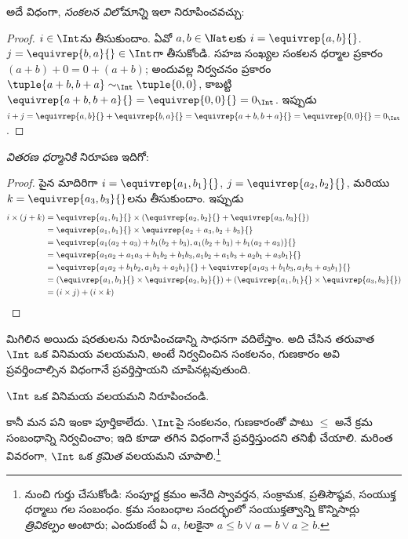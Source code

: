 \documentclass[../../../include/open-logic-section]{subfiles}
\begin{document}
అదే విధంగా, \emph{సంకలన విలోమాన్ని} ఇలా నిరూపించవచ్చు:

\begin{proof}
$i \in \Int$ను తీసుకుందాం. ఏవో $a,b \in \Nat$లకు
$i = \equivrep{a,b}{}$. $j = \equivrep{b,a}{} \in \Int$గా
తీసుకోండి. సహజ సంఖ్యల సంకలన ధర్మాల ప్రకారం
$(a+b) + 0 = 0 + (a+b)$; అందువల్ల నిర్వచనం ప్రకారం
$\tuple{a+b, b+a} \sim_\Int \tuple{0,0}$, కాబట్టి
$\equivrep{a+b, b+a}{} = \equivrep{0, 0}{} = 0_\Int$. ఇప్పుడు
$i + j = \equivrep{a,b}{}+\equivrep{b,a}{}=
\equivrep{a+b, b+a}{}= \equivrep{0, 0}{} = 0_\Int$.
\end{proof}

\emph{వితరణ ధర్మానికి} నిరూపణ ఇదిగో:

\begin{proof}
పైన మాదిరిగా $i = \equivrep{a_1, b_1}{}$,
$j = \equivrep{a_2,b_2}{}$, మరియు $k = \equivrep{a_3, b_3}{}$లను
తీసుకుందాం. ఇప్పుడు
\begin{align*}
	i \times (j + k)
	&= \equivrep{a_1, b_1}{} \times (\equivrep{a_2,b_2}{} + \equivrep{a_3, b_3}{})\\
	&= \equivrep{a_1, b_1}{} \times \equivrep{a_2 + a_3,b_2+b_3}{}\\
	&= \equivrep{a_1  (a_2 + a_3) + b_1  (b_2+b_3), a_1  (b_2 + b_3) + b_1 (a_2 + a_3)}{}\\
	&= \equivrep{a_1 a_2 + a_1a_3 + b_1 b_2+b_1b_3, a_1 b_2 + a_1b_3 + a_2b_1 + a_3b_1}{}\\
	&= \equivrep{a_1a_2 + b_1b_2, a_1b_2 + a_2b_1}{} + \equivrep{a_1a_3 + b_1b_3, a_1b_3 + a_3b_1}{}\\
	&= (\equivrep{a_1, b_1}{} \times \equivrep{a_2,b_2}{}) + (\equivrep{a_1, b_1}{} \times  \equivrep{a_3, b_3}{})\\
	&= (i \times j) + (i \times k)
\end{align*}
\end{proof}

మిగిలిన అయిదు షరతులను నిరూపించడాన్ని సాధనగా వదిలేస్తాం. అది చేసిన
తరువాత $\Int$ ఒక వినిమయ వలయమని, అంటే నిర్వచించిన సంకలనం, గుణకారం
అవి ప్రవర్తించాల్సిన విధంగానే ప్రవర్తిస్తాయని చూపినట్లవుతుంది.

\begin{prob}
$\Int$ ఒక వినిమయ వలయమని నిరూపించండి.
\end{prob}

కానీ మన పని ఇంకా పూర్తికాలేదు. $\Int$పై సంకలనం, గుణకారంతో పాటు
$\leq$ అనే క్రమ సంబంధాన్ని నిర్వచించాం; ఇది కూడా తగిన విధంగానే
ప్రవర్తిస్తుందని తనిఖీ చేయాలి. మరింత వివరంగా, $\Int$ ఒక
\emph{క్రమిత} వలయమని చూపాలి.\footnote{
 నుంచి గుర్తు చేసుకోండి: సంపూర్ణ
క్రమం అనేది స్వావర్తన, సంక్రామక, ప్రతిసౌష్ఠవ, సంయుక్త ధర్మాలు గల
సంబంధం. క్రమ సంబంధాల సందర్భంలో సంయుక్తత్వాన్ని కొన్నిసార్లు
\emph{త్రివికల్పం} అంటారు; ఎందుకంటే ఏ $a$, $b$లకైనా
$a \leq b \lor a = b \lor a \geq b$.}
\end{document}
